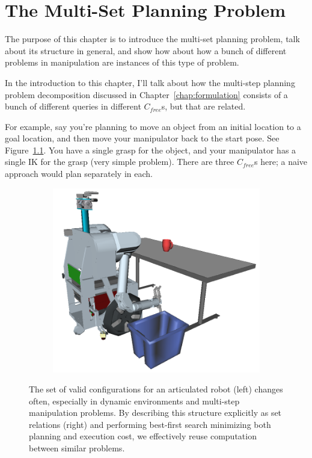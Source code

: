 \documentclass{report}
\begin{document}
\newpage
\chapter{The Multi-Set Planning Problem}
\label{chap:multi-set}

The purpose of this chapter is to introduce the multi-set planning
problem,
talk about its structure in general,
and show how about how a bunch of different problems in manipulation
are instances of this type of problem.

In the introduction to this chapter,
I'll talk about how the multi-step planning problem decomposition
discussed in Chapter~\ref{chap:formulation}
consists of a bunch of different queries in different
$C_{free}$s, but that are related.

For example, say you're planning to move an object from an initial
location to a goal location,
and then move your manipulator back to the start pose.
See Figure~\ref{fig:manip-example}.
You have a single grasp for the object,
and your manipulator has a single IK for the grasp (very simple problem).
There are three $C_{free}$s here;
a naive approach would plan separately in each.

\begin{figure}
\centering
\begin{subfigure}[b]{.45\linewidth}
\includegraphics[width=\columnwidth]{figs/simple-table-clearing-task.png}
\end{subfigure}%
\quad%
\begin{subfigure}[b]{.45\linewidth}

\end{subfigure}
\caption{
  The set of valid configurations for an articulated robot (left)
  changes often,
  especially in dynamic environments
  and multi-step manipulation problems.
  By describing this structure explicitly as set relations (right)
  and performing best-first search
  minimizing both planning and execution cost,
  we effectively reuse computation between similar
  problems.}
\label{fig:manip-example}
\end{figure}
\end{document}
